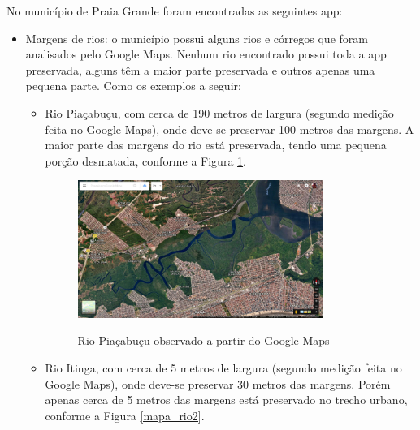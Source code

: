 	No município de Praia Grande foram encontradas as seguintes \gls{app}:
		\begin{itemize}
			\item Margens de rios: o município possui alguns rios e córregos que foram analisados pelo Google Maps. Nenhum rio encontrado possui toda a \gls{app} preservada, alguns têm a maior parte preservada e outros apenas uma pequena parte. Como os exemplos a seguir:
			\begin{itemize}
				\item Rio Piaçabuçu, com cerca de 190 metros de largura (segundo medição feita no Google Maps), onde deve-se preservar 100 metros das margens. A maior parte das margens do rio está preservada, tendo uma pequena porção desmatada, conforme a Figura \ref{mapa_rio}.
				
					\begin{figure}[p]
						\centering
						\caption{Rio Piaçabuçu observado a partir do Google Maps}
						\includegraphics[width=0.8\textwidth]{img/maps_rio.png}
						\label{mapa_rio}
					\end{figure}
					
				\item Rio Itinga, com cerca de 5 metros de largura (segundo medição feita no Google Maps), onde deve-se preservar 30 metros das margens. Porém apenas cerca de 5 metros das margens está preservado no trecho urbano, conforme a Figura \ref{mapa_rio2}.
							

\end{itemize}
\end{itemize}
